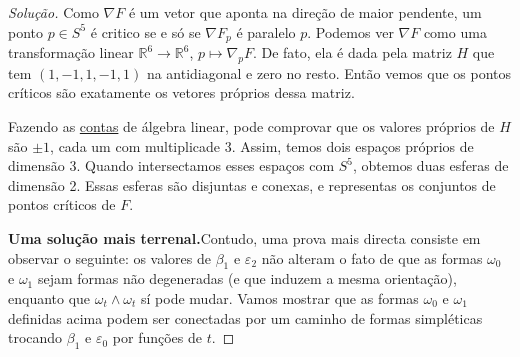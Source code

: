 \begin{proof}[Solução]
Como $\nabla F$ é um vetor que aponta na direção de maior pendente, um ponto $p \in S^5$ é critico se e só se $\nabla F_p$ é paralelo $p$. Podemos ver $\nabla F$ como uma transformação linear $\mathbb{R}^{6}\longrightarrow \mathbb{R}^{6}$, $p \mapsto \nabla_p F$. De fato, ela é dada pela matriz $H$ que tem $(1,-1,1,-1,1)$ na antidiagonal e zero no resto. Então vemos que os pontos críticos são exatamente os vetores próprios dessa matriz.

Fazendo as \href{https://www.wolframalpha.com/input?i=%7B%7B0%2C0%2C0%2C0%2C0%2C1%7D%2C%7B0%2C0%2C0%2C0%2C%E2%88%921%2C0%7D%2C%7B0%2C0%2C0%2C1%2C0%2C0%7D%2C%7B0%2C0%2C1%2C0%2C0%2C0%7D%2C%7B0%2C%E2%88%921%2C0%2C0%2C0%2C0%7D%2C%7B1%2C0%2C0%2C0%2C0%2C0%7D%7D+&lang=es}{contas} de álgebra linear, pode comprovar que os valores próprios de $H$ são $\pm 1$, cada um com multiplicade 3. Assim, temos dois espaços próprios de dimensão 3. Quando intersectamos esses espaços com $S^5$, obtemos duas esferas de dimensão 2. Essas esferas são disjuntas e conexas, e representas os conjuntos de pontos críticos de $F$.

{\color{1}\bfseries Uma solução mais terrenal.}\hspace{1em}Contudo, uma prova mais directa consiste em observar o seguinte: os valores de $\beta_1$ e $\varepsilon_2$ não alteram o fato de que as formas $\omega_0$ e $\omega_1$ sejam formas não degeneradas (e que induzem a mesma orientação), enquanto que $\omega_t\wedge \omega_t$ sí pode mudar. Vamos mostrar que as formas $\omega_0$ e $\omega_1$ definidas acima podem ser conectadas por um caminho de formas simpléticas trocando $\beta_1$ e $\varepsilon_0$ por funções de $t$.


\end{proof}
